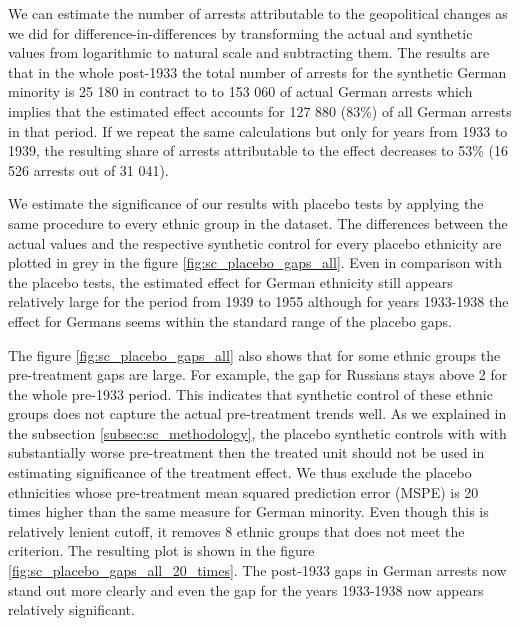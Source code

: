 We can estimate the number of arrests attributable to the geopolitical changes as we did for difference-in-differences by transforming the actual  and synthetic values from logarithmic to natural scale and subtracting  them. The results are   
 that in the whole post-1933 the total number of arrests for the synthetic German minority is  25 180 in contract to to  153 060 of actual German arrests which implies that the estimated effect accounts for 127 880 (83\%) of all German arrests in that period. If we repeat the same calculations but  only for years from 1933 to 1939, 
 the resulting share of arrests attributable to the effect decreases to 53\% (16 526 arrests out of 31 041). 


We estimate the significance of our results with placebo tests by applying the same procedure to every ethnic group in the dataset. The differences between the actual values and the respective synthetic control for every placebo ethnicity are plotted in grey in the figure \ref{fig:sc_placebo_gaps_all}. Even in comparison with the placebo tests, 
the estimated effect for German ethnicity  still appears relatively large for the period from 1939 to 1955 although for years 1933-1938 the effect for Germans seems within the standard range of the placebo gaps.

The figure \ref{fig:sc_placebo_gaps_all} also shows that for some ethnic groups the pre-treatment gaps are large.
 For example, the gap for Russians stays above 2 for the  whole pre-1933 period. 
 This indicates that synthetic control of these ethnic groups does not capture the actual pre-treatment trends well. 
 As we explained in the subsection \ref{subsec:sc_methodology}, the placebo synthetic controls  with with substantially  worse pre-treatment then the treated unit should not be 
used in estimating significance of the treatment effect. 
We thus  exclude the placebo ethnicities whose pre-treatment mean squared prediction error (MSPE) is 20 times higher than the same measure for German minority. Even though this is relatively lenient cutoff, it removes  8 ethnic groups that does not meet the criterion. 
The resulting plot is shown in the figure \ref{fig:sc_placebo_gaps_all_20_times}. The post-1933 gaps in German arrests now stand out more clearly and even the gap for the years 1933-1938 now appears relatively significant.  

